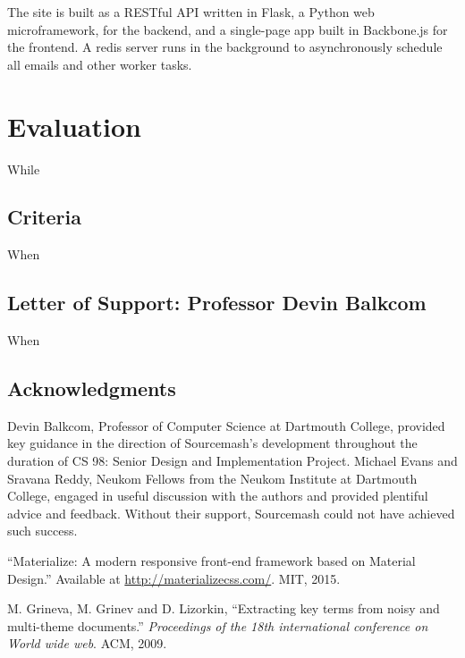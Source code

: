 \documentclass[11pt]{article}
\begin{document}
The site is built as a RESTful API written in Flask, a Python web microframework, for the backend, and a single-page app built in Backbone.js for the frontend. A redis server runs in the background to asynchronously schedule all emails and other worker tasks.


\section{Evaluation}

While

\subsection{Criteria}

When

\subsection{Letter of Support: Professor Devin Balkcom}

When



\subsection*{Acknowledgments}
Devin Balkcom, Professor of Computer Science at Dartmouth College, provided key guidance in the direction of Sourcemash's development throughout the duration of CS 98: Senior Design and Implementation Project. Michael Evans and Sravana Reddy, Neukom Fellows from the Neukom Institute at Dartmouth College, engaged in useful discussion with the authors and provided plentiful advice and feedback. Without their support, Sourcemash could not have achieved such success.


\begin{thebibliography}{99}

  ``Materialize: A modern responsive front-end framework based on Material Design.'' Available at \url{http://materializecss.com/}. MIT, 2015.
  
  M. Grineva, M. Grinev and D. Lizorkin, ``Extracting key terms from noisy and multi-theme documents.'' \emph{Proceedings of the 18th international conference on World wide web}. ACM, 2009.
  
\end{thebibliography}
\end{document}
